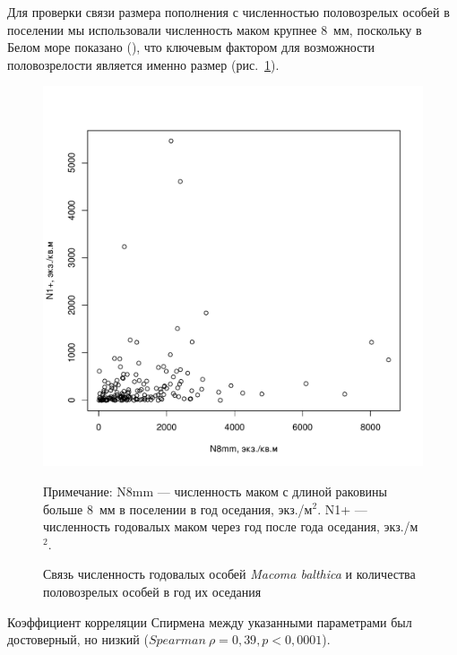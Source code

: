 Для проверки связи размера пополнения с численностью половозрелых особей в поселении мы использовали численность маком крупнее $8$~мм, поскольку в Белом море показано (\cite{Semenova_1980, Maximovich_1985}), что ключевым фактором для возможности половозрелости является именно размер (рис.~\ref{ris:N1year_vs_N8mm}).
    \begin{figure}[p]
        \includegraphics[width=\textwidth]{../White_Sea/oneyear_all_Kandalaksha_all/N8mm_vs_N1y_1.pdf}
    \caption{Связь численность годовалых особей {\it Macoma balthica} и количества половозрелых особей в год их оседания}
    \label{ris:N1year_vs_N8mm}

	\footnotesize{Примечание: N8mm --- численность маком с длиной раковины больше $8$~мм в поселении  в год оседания, экз./м$^2$. N1+ ---численность годовалых маком через год после года оседания, экз./м$^2$.}
    \end{figure}
Коэффициент корреляции Спирмена между указанными параметрами был достоверный, но низкий ($Spearman\ \rho = 0,39, p < 0,0001$). 

